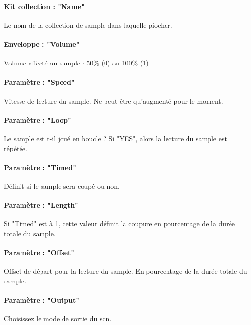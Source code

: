 \documentclass[12pt,a4paper]{article}
\begin{document}

    \paragraph{Kit collection : "Name"} Le nom de la collection de sample dans laquelle piocher.

    \paragraph{Enveloppe : "Volume"} Volume affecté au sample : 50\% (0) ou 100\% (1).

    \paragraph{Paramètre : "Speed"} Vitesse de lecture du sample.
                                    Ne peut être qu'augmenté pour le moment.

    \paragraph{Paramètre : "Loop"} Le sample est t-il joué en boucle ?
                                    Si "YES", alors la lecture du sample est répétée.

    \paragraph{Paramètre : "Timed"} Définit si le sample sera coupé ou non.

    \paragraph{Paramètre : "Length"} Si "Timed" est à 1, cette valeur définit la coupure en pourcentage de la durée totale du sample.

    \paragraph{Paramètre : "Offset"} Offset de départ pour la lecture du sample.
                                    En pourcentage de la durée totale du sample.

    \paragraph{Paramètre : "Output"} Choisissez le mode de sortie du son.
    \medskip
\end{document}
